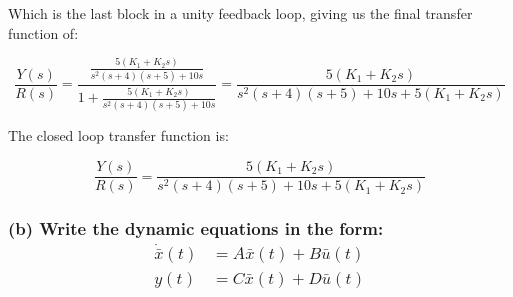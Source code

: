 \documentclass[12pt, letterpaper]{../assignment}
\begin{document}
\begin{center}
    \end{center}


Which is the last block in a unity feedback loop, giving us the final transfer function of:

$$ \frac{Y(s)}{R(s)} = \frac{\frac{5(K_1 + K_2 s)}{s^2(s+4)(s+5) + 10s}}{1 +\frac{5(K_1 + K_2 s)}{s^2(s+4)(s+5) + 10s}}
= \frac{5(K_1 + K_2 s)}{s^2(s+4)(s+5) + 10s +5(K_1 + K_2 s)} $$

The closed loop transfer function is:

\begin{answer}
$$ \frac{Y(s)}{R(s)} = \frac{5(K_1 + K_2 s)}{s^2(s+4)(s+5) + 10s +5(K_1 + K_2 s)} $$
\end{answer}

\subsubsection*{(b) Write the dynamic equations in the form:\\
{\boldmath} \begin{equation*}
    \begin{aligned}
        \dot{\bar{x}}(t) &= A \bar{x}(t) + B \bar{u}(t)\\
        y(t) &= C \bar{x} (t) + D \bar{u}(t)
    \end{aligned}
\end{equation*}}
\end{document}
